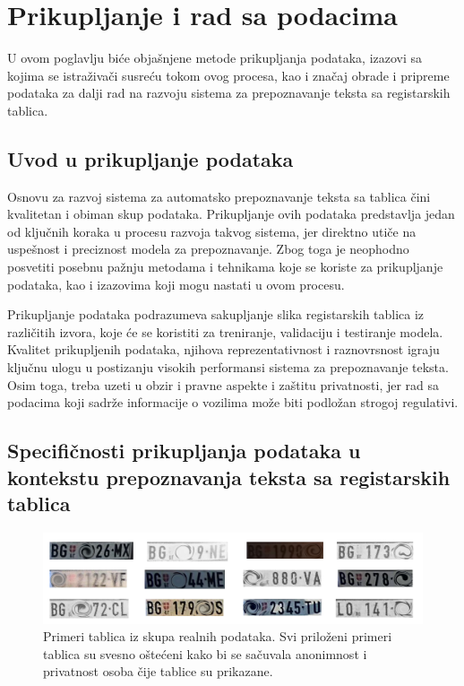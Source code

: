 \documentclass[a4paper,12pt]{article}
\begin{document}
	\section{Prikupljanje i rad sa podacima}
	U ovom poglavlju biće objašnjene metode prikupljanja podataka, izazovi sa kojima se istraživači susreću tokom ovog procesa, kao i značaj obrade i pripreme podataka za dalji rad na razvoju sistema za prepoznavanje teksta sa registarskih tablica.
	
	\subsection{Uvod u prikupljanje podataka}
	Osnovu za razvoj sistema za automatsko prepoznavanje teksta sa tablica čini kvalitetan i obiman skup podataka. Prikupljanje ovih podataka predstavlja jedan od ključnih koraka u procesu razvoja takvog sistema, jer direktno utiče na uspešnost i preciznost modela za prepoznavanje. Zbog toga je neophodno posvetiti posebnu pažnju metodama i tehnikama koje se koriste za prikupljanje podataka, kao i izazovima koji mogu nastati u ovom procesu.
	
	Prikupljanje podataka podrazumeva sakupljanje slika registarskih tablica iz različitih izvora, koje će se koristiti za treniranje, validaciju i testiranje modela. Kvalitet prikupljenih podataka, njihova reprezentativnost i raznovrsnost igraju ključnu ulogu u postizanju visokih performansi sistema za prepoznavanje teksta. Osim toga, treba uzeti u obzir i pravne aspekte i zaštitu privatnosti, jer rad sa podacima koji sadrže informacije o vozilima može biti podložan strogoj regulativi.
	
	\subsection{Specifičnosti prikupljanja podataka u kontekstu prepoznavanja teksta sa registarskih tablica}
	\begin{figure}[H]
		\centering
		\includegraphics[width=\textwidth]{assets/license-plate-samples.png}
		\caption{Primeri tablica iz skupa realnih podataka. Svi priloženi primeri tablica su svesno oštećeni kako bi se sačuvala anonimnost i privatnost osoba čije tablice su prikazane.}
		\label{fig:license-plate-samples}
	\end{figure}
	
\end{document}
